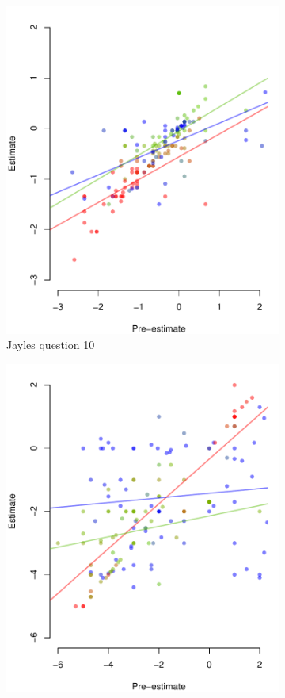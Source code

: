 \documentclass[9pt,twoside,lineno]{pnas-new}
\begin{document}
\begin{figure}[htbp]
\begin{subfigure}[b]{.24\textwidth}
		\includegraphics[width=\textwidth]{../plots/jayles10_vs_xp.pdf}
		\caption{Jayles question 10}
	\end{subfigure}
	\begin{subfigure}[b]{.24\textwidth}
		\includegraphics[width=\textwidth]{../plots/jayles23_vs_xp.pdf}

\end{subfigure}
\end{figure}
\end{document}
